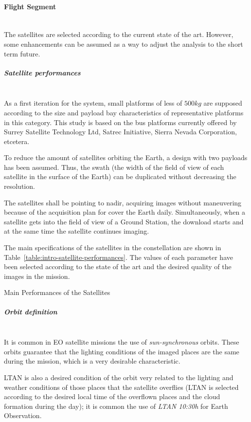 \paragraph{Flight Segment}~\\
The satellites are selected according to the current state of the art. However,
some enhancements can be assumed as a way to adjust the analysis to the short
term future.


\subparagraph{Satellite performances}~\\
As a first iteration for the system, small platforms of less of $500kg$ are supposed according to the size and payload bay characteristics of representative platforms in this category. This study is based on the bus platforms currently offered by Surrey Satellite Technology Ltd, Satrec Initiative, Sierra Nevada Corporation, etcetera.

To reduce the amount of satellites orbiting the Earth, a design with two payloads has been assumed. Thus, the swath (the width of the field of view of each satellite in the surface of the Earth) can be duplicated without decreasing the resolution.

The satellites shall be pointing to nadir, acquiring images without maneuvering because of the acquisition plan for cover the Earth daily. Simultaneously, when a satellite gets into the field of view of a Ground Station, the download starts and at the same time the satellite continues imaging.

The main specifications of the satellites in the constellation are shown in Table~\ref{table:intro-satellite-performances}. The values of each parameter have been selected according to the state of the art and the desired quality of the images in the mission.

\begin{table}[hp]
  \centering
  {\small
  
  }
  \caption{Main Performances of the Satellites}
  \label{table:intro-satellite-performances}
\end{table}


\subparagraph{Orbit definition}~\\
It is common in \acs{EO} satellite missions the use of \emph{sun-synchronous} orbits. These orbits guarantee that the lighting conditions of the imaged places are the same during the mission, which is a very desirable characteristic.

\acs{LTAN} is also a desired condition of the orbit very related to the lighting and weather conditions of those places that the satellite overflies (\acs{LTAN} is selected according to the desired local time of the overflown places and the cloud formation during the day); it is common the use of \emph{LTAN 10:30h} for Earth Observation.

